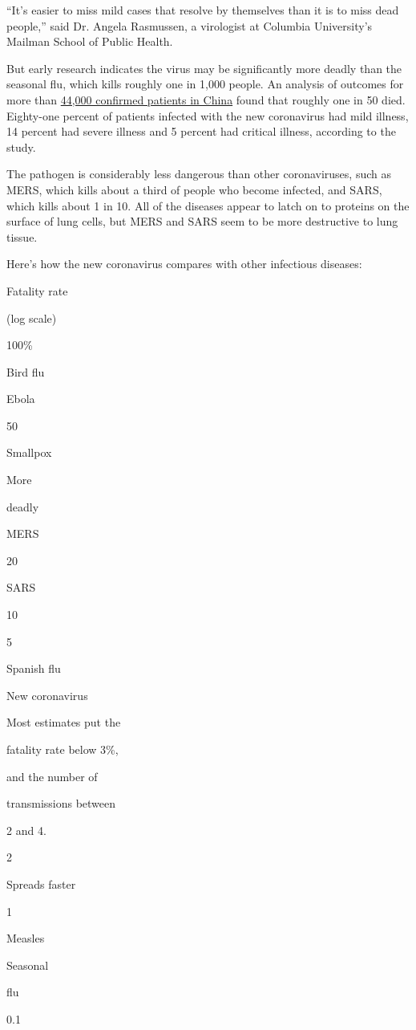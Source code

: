 ``It's easier to miss mild cases that resolve by themselves than it is
to miss dead people,'' said Dr. Angela Rasmussen, a virologist at
Columbia University's Mailman School of Public Health.

But early research indicates the virus may be significantly more deadly
than the seasonal flu, which kills roughly one in 1,000 people. An
analysis of outcomes for more than
\href{https://jamanetwork.com/journals/jama/fullarticle/2762130}{44,000
confirmed patients in China} found that roughly one in 50 died.
Eighty-one percent of patients infected with the new coronavirus had
mild illness, 14 percent had severe illness and 5 percent had critical
illness, according to the study.

The pathogen is considerably less dangerous than other coronaviruses,
such as MERS, which kills about a third of people who become infected,
and SARS, which kills about 1 in 10. All of the diseases appear to latch
on to proteins on the surface of lung cells, but MERS and SARS seem to
be more destructive to lung tissue.

Here's how the new coronavirus compares with other infectious diseases:

Fatality rate

(log scale)

100\%

Bird flu

Ebola

50

Smallpox

More

deadly

MERS

20

SARS

10

5

Spanish flu

New coronavirus

Most estimates put the

fatality rate below 3\%,

and the number of

transmissions between

2 and 4.

2

Spreads faster

1

Measles

Seasonal

flu

0.1

